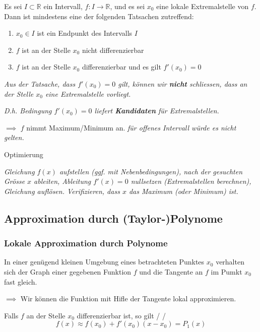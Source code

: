 Es sei $I \subset \mathbb{R}$ ein Intervall, $f: I \rightarrow \mathbb{R}$, und es sei $x_0$ eine lokale Extremalstelle von $f$. Dann ist mindestens eine der folgenden Tatsachen zutreffend:
\begin{enumerate}
    \item $x_0 \in I$ ist ein Endpunkt des Intervalls $I$
    \item $f$ ist an der Stelle $x_0$ nicht differenzierbar
    \item $f$ ist an der Stelle $x_0$ differenzierbar und es gilt $f'(x_0)=0$
\end{enumerate}

\textit{Aus der Tatsache, dass $f'(x_0)=0$ gilt, können wir \textbf{nicht} schliessen, dass an der Stelle $x_0$ eine Extremalstelle vorliegt.}

\textit{D.h. Bedingung $f'(x_0)=0$ liefert \textbf{Kandidaten} für Extremalstellen.}

 $\implies$ $f$ nimmt Maximum/Minimum an.
\textit{für offenes Intervall würde es nicht gelten.}

\begin{exercise}
    Optimierung

    \textit{Gleichung $f(x)$ aufstellen (ggf. mit Nebenbedingungen), nach der gesuchten Grösse $x$ ableiten, Ableitung $f'(x)=0$ nullsetzen (Extremalstellen berechnen), Gleichung auflösen. Verifizieren, dass $x$ das Maximum (oder Minimum) ist.}
\end{exercise}

\subsection{Approximation durch (Taylor-)Polynome}
\subsubsection{Lokale Approximation durch Polynome}

In einer genügend kleinen Umgebung eines betrachteten Punktes $x_0$ verhalten sich der Graph einer gegebenen Funktion $f$ und die Tangente an $f$ im Pumkt $x_0$ fast gleich.

$\implies$ Wir können die Funktion mit Hifle der Tangente lokal approximieren.

Falls $f$ an der Stelle $x_0$ differenzierbar ist, so gilt  /  / 
$$f(x) \approx f(x_0) + f'(x_0)(x-x_0)=P_1(x)$$

